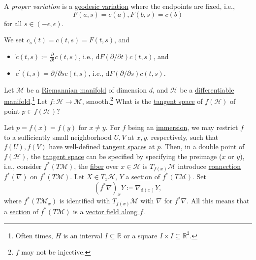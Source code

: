 \begin{definition}\label{def:proper-variation}
	A \emph{proper variation} is a \hyperref[def:geodesic-variation]{geodesic variation} where the endpoints are fixed, i.e.,
	\[
		F(a, s) = c(a), F(b, s)=c(b)
	\]
	for all \(s\in (-\epsilon , \epsilon )\).
\end{definition}

\begin{notation}
	We set \(c_s(t) = c(t, s)=F(t, s)\), and
	\begin{itemize}
		\item \(\dot{c}(t, s) \coloneqq \frac{\partial }{\partial t} c(t, s) \), i.e., \(\mathrm{d} F(\partial / \partial t) c(t, s)\), and
		\item \(c^\prime (t, s) = \partial / \partial s c(t, s)\), i.e., \(\mathrm{d} F (\partial / \partial s)c(t, s)\).
	\end{itemize}
\end{notation}

Let \(\mathcal{M} \) be a \hyperref[def:Riemannian-manifold]{Riemannian manifold} of dimension \(d\), and \(\mathcal{H} \) be a \hyperref[def:smooth-manifold]{differentiable manifold}.\footnote{Often times, \(H\) is an interval \(I\subseteq \mathbb{R} \) or a square \(I\times I \subseteq \mathbb{R} ^2\).} Let \(f\colon \mathcal{H}  \to \mathcal{M} \), smooth.\footnote{\(f\) may not be injective.} What is the \hyperref[def:tangent-space]{tangent space} of \(f(\mathcal{H} )\) of point \(p\in f(\mathcal{H} )\)?
\begin{eg}
	Let \(p = f(x) = f(y)\) for \(x \neq y\). For \(f\) being an \hyperref[def:immersion]{immersion}, we may restrict \(f\) to a sufficiently small neighborhood \(U, V\) at \(x, y\), respectively, such that \(f(U), f(V)\) have well-defined \hyperref[def:tangent-space]{tangent spaces} at \(p\). Then, in a double point of \(f(\mathcal{H} )\), the \hyperref[def:tangent-space]{tangent space} can be specified by specifying the preimage (\(x\) or \(y\)), i.e., consider \(f^{\ast} (T \mathcal{M} )\), the \hyperref[def:fiber]{fiber} over \(x\in \mathcal{H} \) is \(T_{f(x)} \mathcal{M} \) introduce \hyperref[def:linear-connection]{connection} \(f^{\ast} (\nabla )\) on \(f^{\ast} (T \mathcal{M} )\). Let \(X\in T_x \mathcal{H} \), \(Y\) a \hyperref[def:section]{section} of \(f^{\ast} (T \mathcal{M} )\). Set
	\[
		(f^{\ast} \nabla )_x Y\coloneqq \nabla _{\mathrm{d} (x)}Y,
	\]
	where \(f^{\ast} (T \mathcal{M} _x)\) is identified with \(T_{f(x)}\mathcal{M} \) with \(\nabla \) for \(f^{\ast} \nabla \). All this means that a \hyperref[def:section]{section} of \(f^{\ast} (T \mathcal{M} )\) is a \hyperref[def:vector-field-along-curve]{vector field along \(f\)}.
\end{eg}

